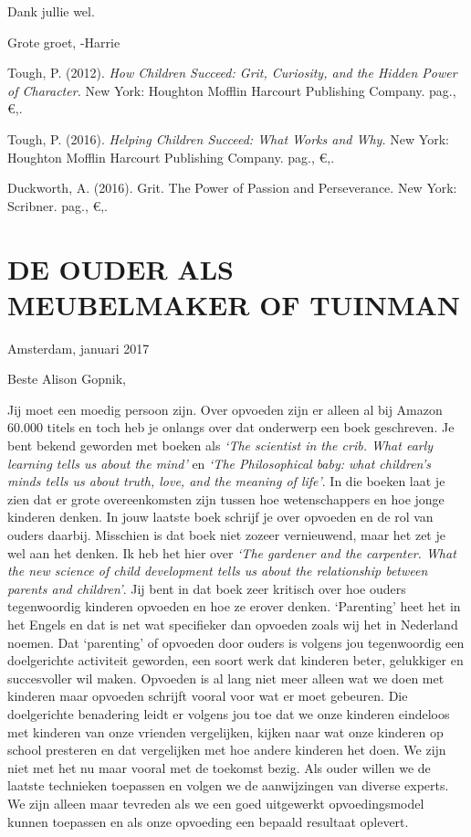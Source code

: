\documentclass[]{book}
\begin{document}
Dank jullie wel.

Grote groet, -Harrie

Tough, P. (2012). \emph{How Children Succeed: Grit, Curiosity, and the
Hidden Power of Character.} New York: Houghton Mofflin Harcourt
Publishing Company. pag., €,.

Tough, P. (2016). \emph{Helping Children Succeed: What Works and Why.}
New York: Houghton Mofflin Harcourt Publishing Company. pag., €,.

Duckworth, A. (2016). Grit. The Power of Passion and Perseverance. New
York: Scribner. pag., €,.

\hypertarget{de-ouder-als-meubelmaker-of-tuinman}{%
\chapter*{DE OUDER ALS MEUBELMAKER OF
TUINMAN}\label{de-ouder-als-meubelmaker-of-tuinman}}

Amsterdam, januari 2017

Beste Alison Gopnik,

Jij moet een moedig persoon zijn. Over opvoeden zijn er alleen al bij
Amazon 60.000 titels en toch heb je onlangs over dat onderwerp een boek
geschreven. Je bent bekend geworden met boeken als \emph{`The scientist
in the crib. What early learning tells us about the mind'} en \emph{`The
Philosophical baby: what children's minds tells us about truth, love,
and the meaning of life'}. In die boeken laat je zien dat er grote
overeenkomsten zijn tussen hoe wetenschappers en hoe jonge kinderen
denken. In jouw laatste boek schrijf je over opvoeden en de rol van
ouders daarbij. Misschien is dat boek niet zozeer vernieuwend, maar het
zet je wel aan het denken. Ik heb het hier over \emph{`The gardener and
the carpenter. What the new science of child development tells us about
the relationship between parents and children'}. Jij bent in dat boek
zeer kritisch over hoe ouders tegenwoordig kinderen opvoeden en hoe ze
erover denken. `Parenting' heet het in het Engels en dat is net wat
specifieker dan opvoeden zoals wij het in Nederland noemen. Dat
`parenting' of opvoeden door ouders is volgens jou tegenwoordig een
doelgerichte activiteit geworden, een soort werk dat kinderen beter,
gelukkiger en succesvoller wil maken. Opvoeden is al lang niet meer
alleen wat we doen met kinderen maar opvoeden schrijft vooral voor wat
er moet gebeuren. Die doelgerichte benadering leidt er volgens jou toe
dat we onze kinderen eindeloos met kinderen van onze vrienden
vergelijken, kijken naar wat onze kinderen op school presteren en dat
vergelijken met hoe andere kinderen het doen. We zijn niet met het nu
maar vooral met de toekomst bezig. Als ouder willen we de laatste
technieken toepassen en volgen we de aanwijzingen van diverse experts.
We zijn alleen maar tevreden als we een goed uitgewerkt opvoedingsmodel
kunnen toepassen en als onze opvoeding een bepaald resultaat oplevert.
\end{document}
